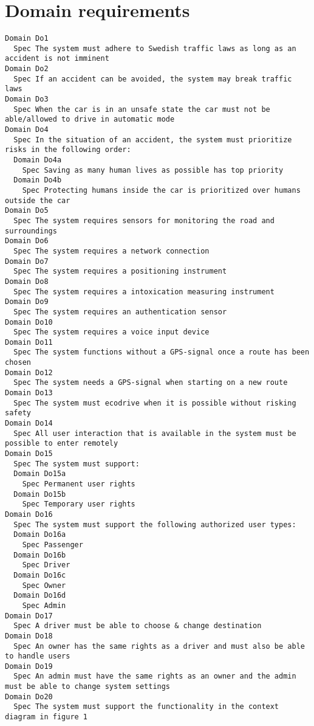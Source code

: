 \begin{lstlisting}

\end{lstlisting}


       \section{Domain requirements}


\begin{lstlisting}
Domain Do1
  Spec The system must adhere to Swedish traffic laws as long as an accident is not imminent
Domain Do2
  Spec If an accident can be avoided, the system may break traffic laws
Domain Do3
  Spec When the car is in an unsafe state the car must not be able/allowed to drive in automatic mode
Domain Do4
  Spec In the situation of an accident, the system must prioritize risks in the following order:
  Domain Do4a
    Spec Saving as many human lives as possible has top priority
  Domain Do4b
    Spec Protecting humans inside the car is prioritized over humans outside the car
Domain Do5
  Spec The system requires sensors for monitoring the road and surroundings
Domain Do6
  Spec The system requires a network connection
Domain Do7
  Spec The system requires a positioning instrument
Domain Do8
  Spec The system requires a intoxication measuring instrument
Domain Do9
  Spec The system requires an authentication sensor
Domain Do10
  Spec The system requires a voice input device
Domain Do11
  Spec The system functions without a GPS-signal once a route has been chosen
Domain Do12
  Spec The system needs a GPS-signal when starting on a new route
Domain Do13
  Spec The system must ecodrive when it is possible without risking safety
Domain Do14
  Spec All user interaction that is available in the system must be possible to enter remotely
Domain Do15
  Spec The system must support:
  Domain Do15a
    Spec Permanent user rights
  Domain Do15b
    Spec Temporary user rights
Domain Do16
  Spec The system must support the following authorized user types:
  Domain Do16a
    Spec Passenger
  Domain Do16b
    Spec Driver
  Domain Do16c
    Spec Owner
  Domain Do16d
    Spec Admin
Domain Do17
  Spec A driver must be able to choose & change destination
Domain Do18
  Spec An owner has the same rights as a driver and must also be able to handle users
Domain Do19
  Spec An admin must have the same rights as an owner and the admin must be able to change system settings
Domain Do20
  Spec The system must support the functionality in the context diagram in figure 1

\end{lstlisting}
    
